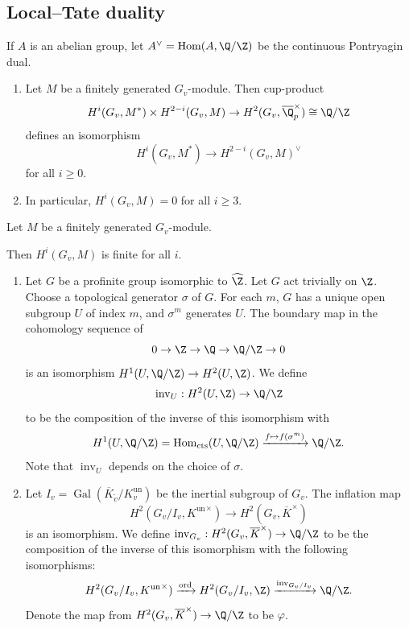 \documentclass[11pt]{article}
\begin{document}
\subsection{Local--Tate duality}

If \( A \) is an abelian group, let \( A^\vee = \operatorname{Hom}(A,\Q/\Z) \) be the continuous Pontryagin dual.
\begin{thm}
    \begin{enumerate}[label=(\arabic*)]
        \item Let \( M \) be a finitely generated \( G_v \)-module. Then cup-product
        \[ H^i(G_v,M^*)\times H^{2-i}(G_v,M)\to H^2(G_v,\overline{\Q}_p^\times) \cong \Q/\Z \]
        defines an isomorphism
        \[ H^i(G_v,M^*)\to H^{2-i}(G_v,M)^\vee \]
        for all \( i\geq 0 \).
        \item In particular, \( H^i(G_v,M)=0 \) for all \( i\geq 3 \).
    \end{enumerate}
\end{thm}
\begin{thm}
    Let \( M \) be a finitely generated \( G_v \)-module.

    Then \( H^i(G_v,M) \) is finite for all \( i \).
\end{thm}
\begin{thm} \label{thm:cup-prod-duality}
    \begin{enumerate}[label=(\arabic*)]
        \item Let \( G \) be a profinite group isomorphic to \( \widehat{\Z} \). Let \( G \) act trivially on \( \Z \). Choose a topological generator \( \sigma \) of \( G \). For each \( m \), \( G \) has a unique open subgroup \( U \) of index \( m \), and \( \sigma^m \) generates \( U \). The boundary map in the cohomology sequence of
        \[ 0 \to \Z \to \Q \to \Q/\Z \to 0 \]
        is an isomorphism \( H^1(U,\Q/\Z)\to H^2(U,\Z) \). We define
        \[ \operatorname{inv}_U: H^2(U,\Z)\to \Q/\Z \]
        to be the composition of the inverse of this isomorphism with
        \[ H^1(U,\Q/\Z)=\operatorname{Hom}_{\operatorname{cts}}(U,\Q/\Z) \xrightarrow{f\mapsto f(\sigma^m)} \Q/\Z. \]
        Note that \( \operatorname{inv}_U \) depends on the choice of \( \sigma \).
        \item Let \( I_v = \operatorname{Gal}(\overline{K}_{\widetilde{v}}/K_v^{\operatorname{un}}) \) be the inertial subgroup of \( G_v \). The inflation map
        \[ H^2(G_v/I_v, {K^{\operatorname{un}}}^\times)\to H^2(G_v,\overline{K}^\times) \]
        is an isomorphism. We define \( \operatorname{inv}_{G_v}: H^2(G_v,\overline{K}^\times)\to \Q/\Z \) to be the composition of the inverse of this isomorphism with the following isomorphisms:
        \[ H^2(G_v/I_v,{K^{\operatorname{un}}}^\times)\xrightarrow{\operatorname{ord}} H^2(G_v/I_v,\Z) \xrightarrow{\operatorname{inv}_{G_v/I_v}} \Q/\Z. \]
        Denote the map from $H^2 (G_v, \overline{K}^\times) \to \Q/\Z$ to be $\varphi$.
    \end{enumerate}
\end{thm}
\end{document}
